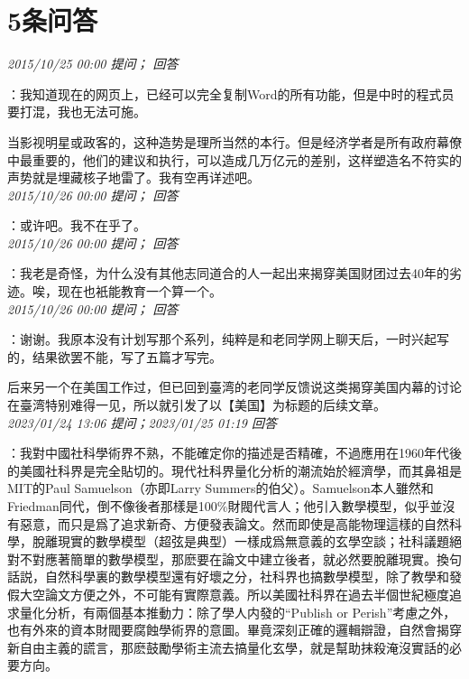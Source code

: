 \documentclass[twocolumn]{ctexart}
\begin{document}
\section{5条问答}

\textit{\hfill\noindent\small 2015/10/25 00:00 提问； 回答}

：我知道现在的网页上，已经可以完全复制Word的所有功能，但是中时的程式员要打混，我也无法可施。

当影视明星或政客的，这种造势是理所当然的本行。但是经济学者是所有政府幕僚中最重要的，他们的建议和执行，可以造成几万亿元的差别，这样塑造名不符实的声势就是埋藏核子地雷了。我有空再详述吧。\\

\textit{\hfill\noindent\small 2015/10/26 00:00 提问； 回答}

：或许吧。我不在乎了。\\

\textit{\hfill\noindent\small 2015/10/26 00:00 提问； 回答}

：我老是奇怪，为什么没有其他志同道合的人一起出来揭穿美国财团过去40年的劣迹。唉，现在也衹能教育一个算一个。\\

\textit{\hfill\noindent\small 2015/10/26 00:00 提问； 回答}

：谢谢。我原本没有计划写那个系列，纯粹是和老同学网上聊天后，一时兴起写的，结果欲罢不能，写了五篇才写完。

后来另一个在美国工作过，但已回到臺湾的老同学反馈说这类揭穿美国内幕的讨论在臺湾特别难得一见，所以就引发了以【美国】为标题的后续文章。\\

\textit{\hfill\noindent\small 2023/01/24 13:06 提问；2023/01/25 01:19 回答}

：我對中國社科學術界不熟，不能確定你的描述是否精確，不過應用在1960年代後的美國社科界是完全貼切的。現代社科界量化分析的潮流始於經濟學，而其鼻祖是MIT的Paul Samuelson（亦即Larry Summers的伯父）。Samuelson本人雖然和Friedman同代，倒不像後者那樣是100\%財閥代言人；他引入數學模型，似乎並沒有惡意，而只是爲了追求新奇、方便發表論文。然而即使是高能物理這樣的自然科學，脫離現實的數學模型（超弦是典型）一樣成爲無意義的玄學空談；社科議題絕對不對應著簡單的數學模型，那麽要在論文中建立後者，就必然要脫離現實。換句話説，自然科學裏的數學模型還有好壞之分，社科界也搞數學模型，除了教學和發假大空論文方便之外，不可能有實際意義。所以美國社科界在過去半個世紀極度追求量化分析，有兩個基本推動力：除了學人内發的“Publish or Perish”考慮之外，也有外來的資本財閥要腐蝕學術界的意圖。畢竟深刻正確的邏輯辯證，自然會揭穿新自由主義的謊言，那麽鼓勵學術主流去搞量化玄學，就是幫助抹殺淹沒實話的必要方向。
\end{document}
